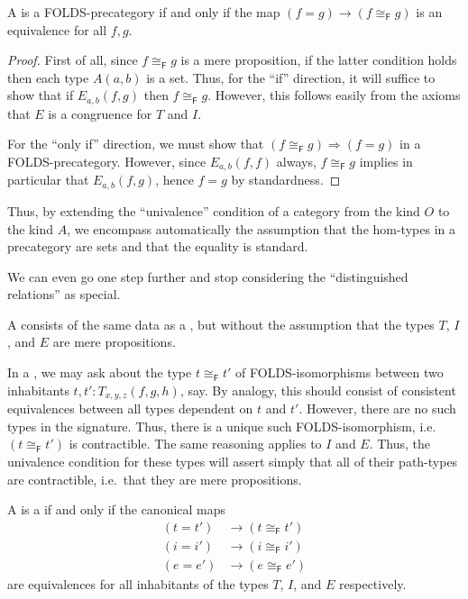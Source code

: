\documentclass{amsart}
\newcommand{\fiso}{\cong_{\textsf{F}}}
\begin{document}
\begin{thm}
  A  is a FOLDS-precategory if and only if the map $(f=g) \to (f\fiso g)$ is an equivalence for all $f,g$.
\end{thm}
\begin{proof}
  First of all, since $f\fiso g$ is a mere proposition, if the latter condition holds then each type $A(a,b)$ is a set.
  Thus, for the ``if'' direction, it will suffice to show that if $E_{a,b}(f,g)$ then $f\fiso g$.
  However, this follows easily from the axioms that $E$ is a congruence for $T$ and $I$.

  For the ``only if'' direction, we must show that $(f\fiso g) \Rightarrow (f=g)$ in a FOLDS-precategory.
  However, since $E_{a,b}(f,f)$ always, $f\fiso g$ implies in particular that $E_{a,b}(f,g)$, hence $f=g$ by standardness.
\end{proof}

Thus, by extending the ``univalence'' condition of a category from the kind $O$ to the kind $A$, we encompass automatically the assumption that the hom-types in a precategory are sets and that the equality is standard.

We can even go one step further and stop considering the ``distinguished relations'' as special.

\begin{defn}
  A \textbf{} consists of the same data as a , but without the assumption that the types $T$, $I$, and $E$ are mere propositions.
\end{defn}

In a , we may ask about the type $t\fiso t'$ of FOLDS-iso\-mor\-phisms between two inhabitants $t,t':T_{x,y,z}(f,g,h)$, say.
By analogy, this should consist of consistent equivalences between all types dependent on $t$ and $t'$.
However, there are no such types in the signature.
Thus, there is a unique such FOLDS-isomorphism, i.e.\ $(t\fiso t')$ is contractible.
The same reasoning applies to $I$ and $E$.
Thus, the univalence condition for these types will assert simply that all of their path-types are contractible, i.e.\ that they are mere propositions.

\begin{thm}
  A  is a  if and only if the canonical maps
  \begin{align*}
    (t= t') &\to (t\fiso t')\\
    (i=i') &\to (i\fiso i')\\
    (e=e') &\to (e\fiso e')
  \end{align*}
  are equivalences for all inhabitants of the types $T$, $I$, and $E$ respectively.
\end{thm}
\end{document}
